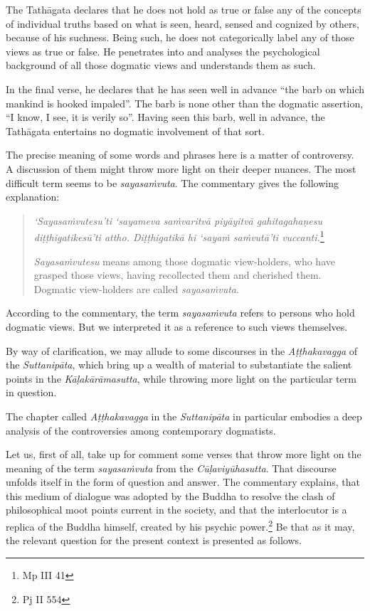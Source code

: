 The Tathāgata declares that he does not hold as true or false any of the concepts of individual truths based on what is seen, heard, sensed and cognized by others, because of his suchness. Being such, he does not categorically label any of those views as true or false. He penetrates into and analyses the psychological background of all those dogmatic views and understands them as such.

In the final verse, he declares that he has seen well in advance ``the barb on which mankind is hooked impaled''. The barb is none other than the dogmatic assertion, ``I know, I see, it is verily so''. Having seen this barb, well in advance, the Tathāgata entertains no dogmatic involvement of that sort.

The precise meaning of some words and phrases here is a matter of controversy. A discussion of them might throw more light on their deeper nuances. The most difficult term seems to be \emph{sayasaṁvuta}. The commentary gives the following explanation:

\begin{quote}
\emph{`Sayasaṁvutesu'ti `sayameva saṁvaritvā piyāyitvā gahitagahaṇesu diṭṭhigatikesū'ti attho. Diṭṭhigatikā hi `sayaṁ saṁvutā'ti vuccanti.}\footnote{Mp III 41}

\emph{Sayasaṁvutesu} means among those dogmatic view-holders, who have grasped those views, having recollected them and cherished them. Dogmatic view-holders are called \emph{sayasaṁvuta}.
\end{quote}

According to the commentary, the term \emph{sayasaṁvuta} refers to persons who hold dogmatic views. But we interpreted it as a reference to such views themselves.

By way of clarification, we may allude to some discourses in the \emph{Aṭṭhakavagga} of the \emph{Suttanipāta}, which bring up a wealth of material to substantiate the salient points in the \emph{Kāḷakārāmasutta}, while throwing more light on the particular term in question.

The chapter called \emph{Aṭṭhakavagga} in the \emph{Suttanipāta} in particular embodies a deep analysis of the controversies among contemporary dogmatists.

Let us, first of all, take up for comment some verses that throw more light on the meaning of the term \emph{sayasaṁvuta} from the \emph{Cūḷaviyūhasutta}. That discourse unfolds itself in the form of question and answer. The commentary explains, that this medium of dialogue was adopted by the Buddha to resolve the clash of philosophical moot points current in the society, and that the interlocutor is a replica of the Buddha himself, created by his psychic power.\footnote{Pj II 554} Be that as it may, the relevant question for the present context is presented as follows.

